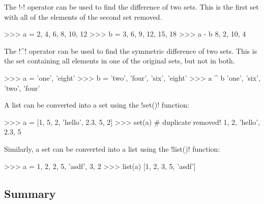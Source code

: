 \documentclass[11pt]{cselabheader}
\begin{document}
The \pythoninline!-! operator can be used to find the difference of two sets.
This is the first set with all of the elements of the second set removed.
\begin{pyconcode}
>>> a = {2, 4, 6, 8, 10, 12}
>>> b = {3, 6, 9, 12, 15, 18}
>>> a - b
{8, 2, 10, 4}
\end{pyconcode}

The \pythoninline!^! operator can be used to find the symmetric difference
of two sets. This is the set containing all elements in one of the original
sets, but not in both.
\begin{pyconcode}
>>> a = {'one', 'eight'}
>>> b = {'two', 'four', 'six', 'eight'}
>>> a ^ b
{'one', 'six', 'two', 'four'}
\end{pyconcode}

A list can be converted into a set using the \pythoninline!set()! function:
\begin{pyconcode}
>>> a = [1, 5, 2, 'hello', 2.3, 5, 2]
>>> set(a) # duplicate removed!
{1, 2, 'hello', 2.3, 5}
\end{pyconcode}

Similarly, a set can be converted into a list using the \pythoninline!list()!
function:
\begin{pyconcode}
>>> a = {1, 2, 2, 5, 'asdf', 3, 2}
>>> list(a)
[1, 2, 3, 5, 'asdf']
\end{pyconcode}

\subsection{Summary}
\end{document}
